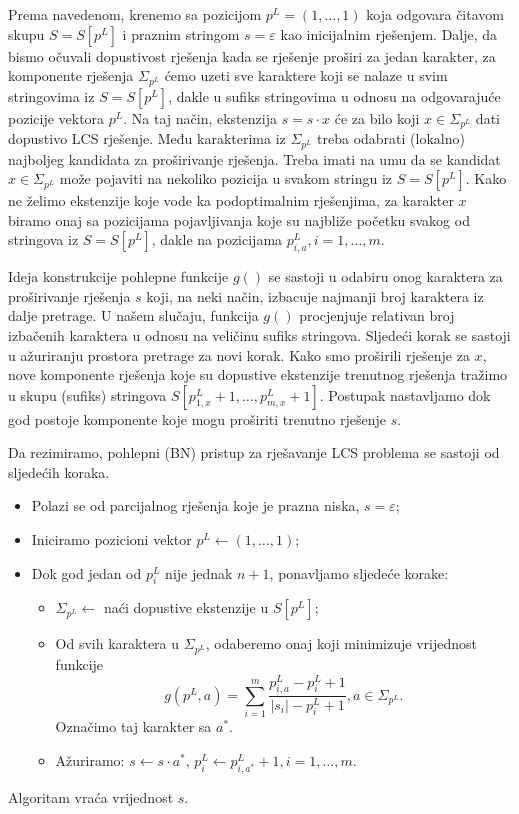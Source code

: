 \documentclass[b5paper, utf8, 11pt, colorlinks]{book}
\theoremstyle{definition}
\begin{document}
 Prema navedenom, krenemo sa pozicijom $p^L = (1, \ldots, 1)$ koja odgovara čitavom skupu $S=S[p^L]$ i praznim stringom $s =\varepsilon$ kao inicijalnim rješenjem. Dalje, da bismo očuvali dopustivost rješenja kada se rješenje proširi za jedan karakter, za komponente rješenja $\Sigma_{p^L}$ ćemo uzeti sve karaktere koji se nalaze u svim stringovima iz $S=S[p^L]$, dakle u sufiks stringovima u odnosu na odgovarajuće pozicije vektora $p^L$. Na taj način,  ekstenzija $s = s \cdot x$  će za bilo koji $x \in \Sigma_{p^L}$ dati dopustivo LCS rješenje. Među karakterima iz $\Sigma_{p^L}$ treba odabrati (lokalno) najboljeg kandidata za proširivanje rješenja. Treba imati na umu da se kandidat $x\in \Sigma_{p^L}$ može pojaviti na nekoliko pozicija u svakom stringu iz $S=S[p^L]$. Kako ne želimo ekstenzije koje vode ka podoptimalnim rješenjima, za karakter $x$ biramo onaj sa pozicijama pojavljivanja koje su najbliže početku svakog od stringova iz $S=S[p^L]$, dakle na pozicijama $p^L_{i,a},i=1,\ldots,m$. 

 Ideja konstrukcije pohlepne funkcije $g()$ se sastoji u odabiru onog karaktera za proširivanje rješenja $s$ koji, na neki način, izbacuje najmanji broj karaktera iz dalje pretrage. U našem slučaju,  funkcija $g()$ procjenjuje relativan broj izbačenih karaktera u odnosu na veličinu sufiks stringova. 
 Sljedeći korak se sastoji u ažuriranju prostora pretrage za novi korak. Kako smo proširili rješenje za $x$, nove komponente rješenja koje su dopustive ekstenzije trenutnog rješenja tražimo u skupu (sufiks) stringova $S[p^L_{1,x}+1,\ldots, p^L_{m, x}+1]$. Postupak nastavljamo dok god postoje komponente koje mogu proširiti trenutno rješenje $s$. 


 Da rezimiramo, pohlepni (BN) pristup za rješavanje LCS problema se sastoji od sljedećih koraka.
\begin{itemize}
	\item Polazi se od parcijalnog rješenja koje je prazna niska, $s=\varepsilon$;
	\item Iniciramo pozicioni vektor $p^L \gets (1,\ldots, 1) $;
	\item Dok god jedan od $p^L_i$ nije jednak $n+1$, ponavljamo sljedeće korake: 
	\begin{itemize}
   	     \item $\Sigma_{p^L} \gets$ naći dopustive ekstenzije u $S[p^L]$;
	      \item Od svih karaktera u $\Sigma_{p^L}$, odaberemo onaj koji minimizuje vrijednost funkcije 
	      $$g( p^L,a) = \sum_{i=1}^m\frac{p^L_{i,a} - p^L_i + 1 }{|s_i| - p^L_i + 1 }, a \in \Sigma_{ p^L }.$$
	      Označimo taj karakter sa $a^*$. 
	      \item Ažuriramo: $s \gets  s \cdot a^*$, $p^L_i \gets p^L_{i, a^*} +1, i = 1,\ldots,m.$
    \end{itemize}
\end{itemize}
Algoritam vraća vrijednost $s$. 
\end{document}
